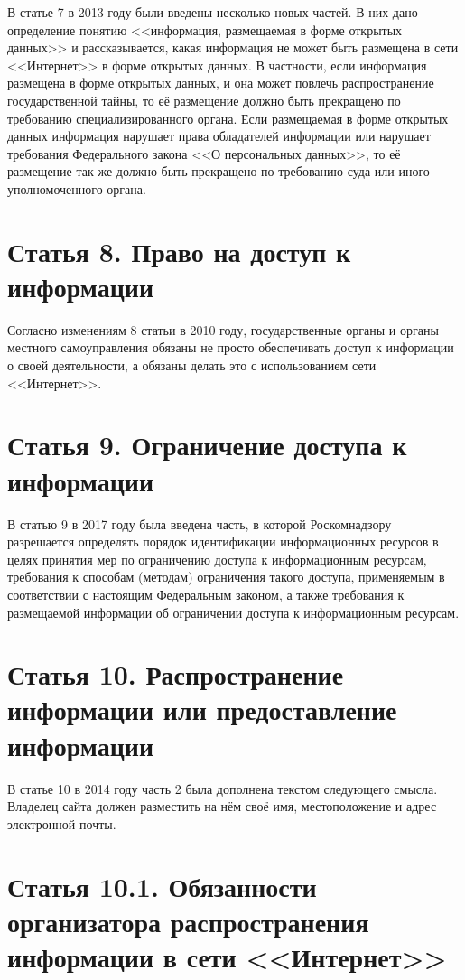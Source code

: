В статье 7 в 2013 году были введены несколько новых частей. В них дано определение понятию <<информация, размещаемая в форме открытых данных>> и рассказывается, какая информация не может быть размещена в сети <<Интернет>> в форме открытых данных. В частности, если информация размещена в форме открытых данных, и она может повлечь распространение государственной тайны, то её размещение должно быть прекращено по требованию специализированного органа. Если размещаемая в форме открытых данных информация нарушает права обладателей информации или нарушает требования Федерального закона <<О персональных данных>>, то её размещение так же должно быть прекращено по требованию суда или иного уполномоченного органа.

\section{Статья 8. Право на доступ к информации}

Согласно изменениям 8 статьи в 2010 году, государственные органы и органы местного самоуправления обязаны не просто обеспечивать доступ к информации о своей деятельности, а обязаны делать это с использованием сети <<Интернет>>.

\section{Статья 9. Ограничение доступа к информации}

В статью 9 в 2017 году была введена часть, в которой Роскомнадзору разрешается определять порядок идентификации информационных ресурсов в целях принятия мер по ограничению доступа к информационным ресурсам, требования к способам (методам) ограничения такого доступа, применяемым в соответствии с настоящим Федеральным законом, а также требования к размещаемой информации об ограничении доступа к информационным ресурсам.

\section{Статья 10. Распространение информации или предоставление информации}

В статье 10 в 2014 году часть 2 была дополнена текстом следующего смысла. Владелец сайта должен разместить на нём своё имя, местоположение и адрес электронной почты.

\section{Статья 10.1. Обязанности организатора распространения информации в сети <<Интернет>>}

